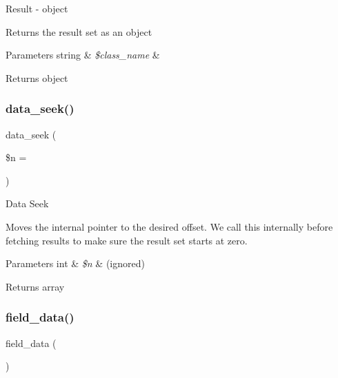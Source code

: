 Result -\/ object

Returns the result set as an object


\begin{DoxyParams}[1]{Parameters}
string & {\em \$class\+\_\+name} & \\
\hline
\end{DoxyParams}
\begin{DoxyReturn}{Returns}
object 
\end{DoxyReturn}
\mbox{\label{class_c_i___d_b__sqlite3__result_a8255ae91816e4206e29eb7581c5af0f1}} 
\subsubsection{\texorpdfstring{data\+\_\+seek()}{data\_seek()}}
{\footnotesize\ttfamily data\+\_\+seek (\begin{DoxyParamCaption}\item[{}]{\$n = {} }\end{DoxyParamCaption})}

Data Seek

Moves the internal pointer to the desired offset. We call this internally before fetching results to make sure the result set starts at zero.


\begin{DoxyParams}[1]{Parameters}
int & {\em \$n} & (ignored) \\
\hline
\end{DoxyParams}
\begin{DoxyReturn}{Returns}
array 
\end{DoxyReturn}
\mbox{\label{class_c_i___d_b__sqlite3__result_a84bffd65e53902ade1591716749a33e3}} 
\subsubsection{\texorpdfstring{field\+\_\+data()}{field\_data()}}
{\footnotesize\ttfamily field\+\_\+data (\begin{DoxyParamCaption}{ }\end{DoxyParamCaption})}

